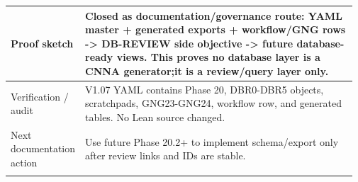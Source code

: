 \begin{longtable}{L{0.16\linewidth} L{0.81\linewidth}}
\hline\addlinespace[0.20em]
Proof sketch & Closed as documentation/\allowbreak{}governance route: YAML master + generated exports + workflow/\allowbreak{}GNG rows -> DB-REVIEW side objective -> future database-ready views. This proves no database layer is a CNNA generator;\newline it is a review/\allowbreak{}query layer only.\\
\hline\addlinespace[0.20em]
Verification /\allowbreak{} audit & V1.07 YAML contains Phase 20, DBR0-DBR5 objects, scratchpads, GNG23-GNG24, workflow row, and generated tables. No Lean source changed.\\
\hline\addlinespace[0.20em]
Next documentation action & Use future Phase 20.2+ to implement schema/\allowbreak{}export only after review links and IDs are stable.\\
\hline\addlinespace[0.20em]
\end{longtable}
